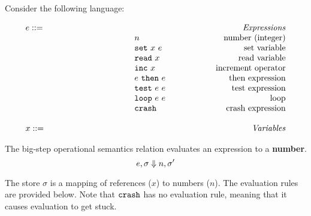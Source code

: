 \documentclass[addpoints]{exam}
\begin{document}
\begin{questions}

  \question[15]
  Consider the following language:

\newcommand{\mydefhead}[2]{\multicolumn{2}{l}{{#1}}&\mbox{\emph{#2}}\\}
\newcommand{\mydefcase}[2]{\qquad\qquad\qquad\qquad\qquad\qquad& #1 &\mbox{#2}\\}

\newcommand{\setexp}[2]{\mbox{\tt set}~#1~#2}
\newcommand{\readexp}[1]{\mbox{\tt read}~#1}
\newcommand{\loopexp}[2]{\mbox{\tt loop}~#1~#2}
\newcommand{\incexp}[1]{\mbox{\tt inc}~{#1}}
\newcommand{\testexp}[2]{\mbox{\tt test}~{#1}~{#2}}
\newcommand{\thenexp}[2]{#1~\mbox{\tt then}~{#2}}
\newcommand{\crashexp}{\mbox{\tt crash}}

\newcommand{\rel}[1]{ \mbox{\sc [#1]} }

\newcommand{\sstep}[2]{{#1} \rightarrow {#2}}
\newcommand{\sstepStore}[4]{{#1},{#2} \rightarrow {#3},{#4}}
\newcommand{\bstep}[2]{{#1} \Downarrow {#2}}
\newcommand{\bstepStore}[4]{{#1},{#2} \Downarrow {#3},{#4}}

\newcommand{\ssrule}[3]{
  \rel{#1} &
  \frac{\strut\begin{array}{@{}c@{}} #2 \end{array}}
       {\strut\begin{array}{@{}c@{}} #3 \end{array}}
   \\~\\
}

\[
  \begin{array}{ll@{\qquad\qquad\qquad}r}
  \mydefhead{e ::=}{Expressions}
    \mydefcase{n}{number (integer)}
    \mydefcase{\setexp{x}{e}}{set variable}
    \mydefcase{\readexp{x}}{read variable}
    \mydefcase{\incexp{x}}{increment operator}
    \mydefcase{\thenexp{e}{e}}{then expression}
    \mydefcase{\testexp{e}{e}}{test expression}
    \mydefcase{\loopexp{e}{e}}{loop}
    \mydefcase{\crashexp}{crash expression}
  \\
  \mydefhead{x ::=\qquad\qquad\qquad\qquad}{Variables}
\end{array}
\]

  The big-step operational semantics relation evaluates an expression to a {\bf number}.
  \[\large
    \bstepStore{e}{\sigma}{n}{\sigma'}
  \]

\noindent
The store $\sigma$ is a mapping of references ($x$) to numbers ($n$).
The evaluation rules are provided below.
Note that $\crashexp$ has no evaluation rule,
meaning that it causes evaluation to get stuck.



\end{questions}
\end{document}
